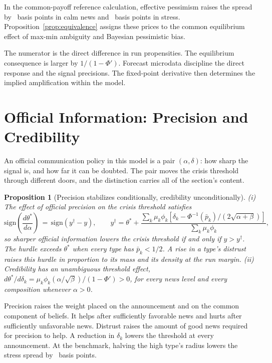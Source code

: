 \documentclass[11pt]{article}
\newtheorem{proposition}{Proposition}
\theoremstyle{definition}
\begin{document}
In the common-payoff reference calculation, effective pessimism raises the spread by \PremCalm\ basis points in calm news and \PremStress\ basis points in stress. Proposition~\ref{prop:equivalence} assigns these prices to the common equilibrium effect of max-min ambiguity and Bayesian pessimistic bias.

The numerator is the direct difference in run propensities. The equilibrium consequence is larger by $1/(1-\Phi')$. Forecast microdata discipline the direct response and the signal precisions. The fixed-point derivative then determines the implied amplification within the model.

\section{Official Information: Precision and Credibility}\label{sec:info}

An official communication policy in this model is a pair $(\alpha, \delta)$: how sharp the signal is, and how far it can be doubted. The pair moves the crisis threshold through different doors, and the distinction carries all of the section's content.

\begin{proposition}[Precision stabilizes conditionally, credibility unconditionally]\label{prop:transparency}
(i) The effect of official precision on the crisis threshold satisfies
\[
\mathrm{sign}\left(\frac{d\theta^*}{d\alpha}\right) \,=\, \mathrm{sign}\left(y^\dagger - y\right),
\qquad
y^\dagger
=\theta^*+
\frac{\sum_k\mu_k\phi_k\left[\delta_k-\Phi^{-1}(\bar p_k)/(2\sqrt{\alpha+\beta})\right]}
{\sum_k\mu_k\phi_k},
\]
so sharper official information lowers the crisis threshold if and only if $y>y^\dagger$. The hurdle exceeds $\theta^*$ when every type has $\bar p_k<1/2$. A rise in a type's distrust raises this hurdle in proportion to its mass and its density at the run margin. (ii) Credibility has an unambiguous threshold effect, $d\theta^*/d\delta_k=\mu_k\phi_k(\alpha/\sqrt\beta)/(1-\Phi')>0$, for every news level and every composition whenever $\alpha>0$.
\end{proposition}

Precision raises the weight placed on the announcement and on the common component of beliefs. It helps after sufficiently favorable news and hurts after sufficiently unfavorable news. Distrust raises the amount of good news required for precision to help. A reduction in $\delta_k$ lowers the threshold at every announcement. At the benchmark, halving the high type's radius lowers the stress spread by \HalfDeltaBp\ basis points.
\end{document}
